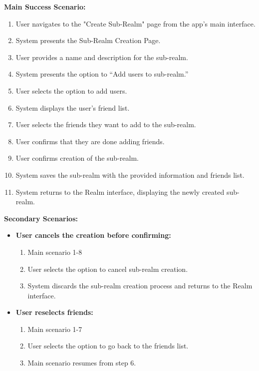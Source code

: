 \documentclass{article}
\begin{document}
\begin{enumerate}[label=\textbf{UC\arabic*}]
        \textbf{Main Success Scenario:}
        \begin{enumerate}[label=\textbf{\arabic*.}]
            \item User navigates to the "Create Sub-Realm" page from the app’s main interface.
            \item System presents the Sub-Realm Creation Page.
            \item User provides a name and description for the sub-realm.
            \item System presents the option to “Add users to sub-realm.”
            \item User selects the option to add users.
            \item System displays the user’s friend list.
            \item User selects the friends they want to add to the sub-realm.
            \item User confirms that they are done adding friends.
            \item User confirms creation of the sub-realm.
            \item System saves the sub-realm with the provided information and friends list.
            \item System returns to the Realm interface, displaying the newly created sub-realm.
        \end{enumerate}
        
        \textbf{Secondary Scenarios:}
        \begin{itemize}
            \item[{}] \textbf{User cancels the creation before confirming:}
            \begin{enumerate}[label=\textbf{\arabic*.}]
                \item Main scenario 1-8
                \item User selects the option to cancel sub-realm creation.
                \item System discards the sub-realm creation process and returns to the Realm interface.
            \end{enumerate}
            
            \item[{}] \textbf{User reselects friends:}
            \begin{enumerate}[label=\textbf{\arabic*.}]
                \item Main scenario 1-7
                \item User selects the option to go back to the friends list.
                \item Main scenario resumes from step 6.
            \end{enumerate}
            

\end{itemize}
\end{enumerate}
\end{document}

